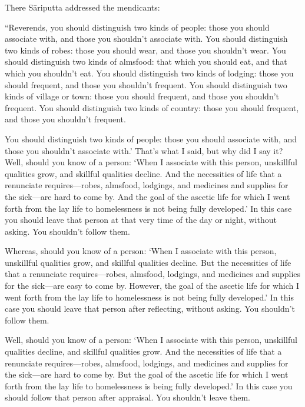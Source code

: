 \documentclass[12pt,openany]{book}%
\begin{document}
There \textsanskrit{Sāriputta} addressed the mendicants: 

“Reverends, you should distinguish two kinds of people: those you should associate with, and those you shouldn’t associate with. You should distinguish two kinds of robes: those you should wear, and those you shouldn’t wear. You should distinguish two kinds of almsfood: that which you should eat, and that which you shouldn’t eat. You should distinguish two kinds of lodging: those you should frequent, and those you shouldn’t frequent. You should distinguish two kinds of village or town: those you should frequent, and those you shouldn’t frequent. You should distinguish two kinds of country: those you should frequent, and those you shouldn’t frequent. 

You should distinguish two kinds of people: those you should associate with, and those you shouldn’t associate with.’ That’s what I said, but why did I say it? Well, should you know of a person: ‘When I associate with this person, unskillful qualities grow, and skillful qualities decline. And the necessities of life that a renunciate requires—robes, almsfood, lodgings, and medicines and supplies for the sick—are hard to come by. And the goal of the ascetic life for which I went forth from the lay life to homelessness is not being fully developed.’ In this case you should leave that person at that very time of the day or night, without asking. You shouldn’t follow them. 

Whereas, should you know of a person: ‘When I associate with this person, unskillful qualities grow, and skillful qualities decline. But the necessities of life that a renunciate requires—robes, almsfood, lodgings, and medicines and supplies for the sick—are easy to come by. However, the goal of the ascetic life for which I went forth from the lay life to homelessness is not being fully developed.’ In this case you should leave that person after reflecting, without asking. You shouldn’t follow them. 

Well, should you know of a person: ‘When I associate with this person, unskillful qualities decline, and skillful qualities grow. And the necessities of life that a renunciate requires—robes, almsfood, lodgings, and medicines and supplies for the sick—are hard to come by. But the goal of the ascetic life for which I went forth from the lay life to homelessness is being fully developed.’ In this case you should follow that person after appraisal. You shouldn’t leave them. 
\end{document}
